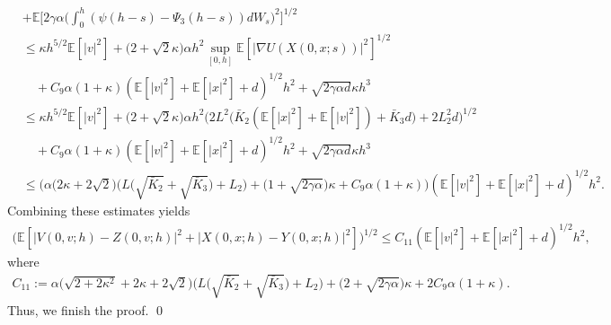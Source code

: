 \documentclass[12pt]{article}
\numberwithin{equation}{section}
\renewenvironment{proof}%
  {\begin{trivlist}%
   \item[]\ignorespaces}%
  {\qed\end{trivlist}}
\newcommand{\E}{\mathbb{E}}
\begin{document}
\begin{proof}
\begin{align}
        &+\mathbb{E}\Big[2\gamma\alpha \Big(\int^h_0 (\psi(h-s)-\Psi_3(h-s)) dW_s\Big)^2\Big]^{1/2} \nonumber\\
        &\leq \kappa h^{5/2}\mathbb{E}[|v|^2]+ \big(2+\sqrt{2}\kappa  \big)\alpha h^{2}\sup_{[0,h]}\mathbb{E}[|\nabla U(X(0,x;s))|^2]^{1/2}\nonumber\\
        &\quad +C_{9}\alpha(1+\kappa)(\mathbb{E}[|v|^2]+\mathbb{E}[|x|^2]+d)^{1/2}h^2+\sqrt{2\gamma \alpha d}\kappa h^3\nonumber\\
        &\leq \kappa h^{5/2}\mathbb{E}[|v|^2]+ \big(2+\sqrt{2}\kappa  \big)\alpha h^{2} \Big(2L^2 \big(\bar{K}_2(\E[|x|^2]+\E[|v|^2])+\bar{K}_3d \big)+2L_2^2d\Big)^{1/2} \nonumber\\
        &\quad +C_{9}\alpha(1+\kappa)(\mathbb{E}[|v|^2]+\mathbb{E}[|x|^2]+d)^{1/2}h^2+\sqrt{2\gamma\alpha d}\kappa h^3 \nonumber\\
        &\leq \Bigg(\alpha\big(2\kappa +2\sqrt{2} \big)\Big(L \big(\sqrt{\bar{K}_2}+\sqrt{\bar{K}_3} \big)+L_2\Big)+ \big(1+\sqrt{2\gamma\alpha} \big)\kappa +C_9\alpha(1+\kappa)\Bigg)(\mathbb{E}[|v|^2]+\mathbb{E}[|x|^2]+d)^{1/2}h^2.
    \end{align}
    Combining these estimates yields
    \begin{align}
         \big(\mathbb{E}[|V(0,v;h)-Z(0,v;h)|^2+|X(0,x;h)-Y(0,x;h)|^2] \big)^{1/2} 
        \leq C_{11}(\mathbb{E}[|v|^2]+\mathbb{E}[|x|^2]+d)^{1/2}h^2,
    \end{align}
    where
    \begin{align}
        C_{11}:=\alpha\big(\sqrt{2+2\kappa ^2}+2\kappa +2\sqrt{2}\big)\Big( L \big(\sqrt{\bar{K}_2}+\sqrt{\bar{K}_3} \big)+L_2 \Big)+ \big(2+\sqrt{2\gamma\alpha} \big)\kappa +2C_9\alpha(1+\kappa).
    \end{align}
    Thus, we finish the proof.
\end{proof}
\fi
\end{document}
